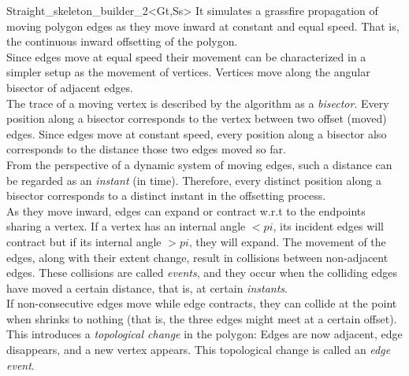 \begin{ccRefClass}{Straight_skeleton_builder_2<Gt,Ss>}
It simulates  a grassfire propagation of moving polygon edges as they move inward at constant
and equal speed. That is, the continuous inward offsetting of the polygon.\\
Since edges move at equal speed their movement can be characterized in a simpler setup as the movement of vertices. Vertices move along the angular bisector of adjacent edges.\\
The trace of a moving vertex is described by the algorithm as a {\em bisector}. 
Every position along a bisector corresponds to the vertex between two offset (moved) edges. Since edges move at constant speed, every position along a bisector also corresponds to the distance those two edges moved so far.\\
From the perspective of a dynamic system of moving edges, such a distance can be regarded as an 
{\em instant} (in time). Therefore, every distinct position along a bisector corresponds to a distinct instant in the offsetting process.\\
As they move inward, edges can expand or contract w.r.t to the endpoints sharing a vertex. If a vertex has an internal angle $<pi$, its incident edges will contract but if its internal angle $>pi$, they will expand. The movement of the edges, along with their extent change, result in collisions between non-adjacent edges. These collisions are called {\em events}, and they occur when the colliding edges have moved a certain distance, that is, at certain \textit{instants}.\\
If non-consecutive edges  move while edge  contracts, they can collide at the point when  shrinks to nothing (that is, the three edges might meet at a certain offset). This introduces a \textit{topological change} in the polygon: Edges  are now adjacent, edge  disappears, and a new vertex appears. This topological change is called an {\em edge event}.\\

\end{ccRefClass}
